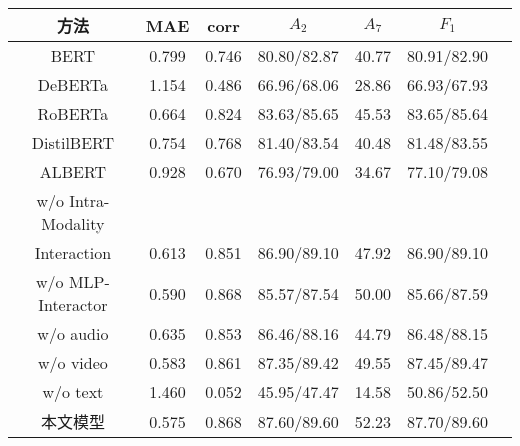
\begin{tabular}{ccccccc} \toprule[1pt] 方法 & MAE & corr & $A_2$ & $A_7$ & $F_1$ \\ \midrule BERT & 0.799 & 0.746 & 80.80/82.87 & 40.77 & 80.91/82.90 \\ DeBERTa & 1.154 & 0.486 & 66.96/68.06 & 28.86 & 66.93/67.93 \\ RoBERTa & 0.664 & 0.824 & 83.63/85.65 & 45.53 & 83.65/85.64 \\ DistilBERT & 0.754 & 0.768 & 81.40/83.54 & 40.48 & 81.48/83.55 \\ ALBERT & 0.928 & 0.670 & 76.93/79.00 & 34.67 & 77.10/79.08 \\ w/o Intra-Modality & & & & & \\ Interaction & 0.613 & 0.851 & 86.90/89.10 & 47.92 & 86.90/89.10 \\ w/o MLP-Interactor & 0.590 & 0.868 & 85.57/87.54 & 50.00 & 85.66/87.59 \\ w/o audio & 0.635 & 0.853 & 86.46/88.16 & 44.79 & 86.48/88.15 \\ w/o video & 0.583 & 0.861 & 87.35/89.42 & 49.55 & 87.45/89.47 \\ w/o text & 1.460 & 0.052 & 45.95/47.47 & 14.58 & 50.86/52.50 \\ 本文模型 & 0.575 & 0.868 & 87.60/89.60 & 52.23 & 87.70/89.60 \\ \bottomrule[1pt] \end{tabular}    
